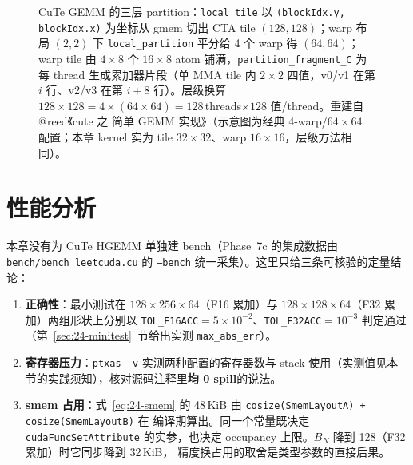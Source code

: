 \begin{figure}[htbp]
\caption{CuTe GEMM 的三层 partition：\texttt{local\_tile} 以 \texttt{\allowbreak{}(block\allowbreak{}Idx.\allowbreak{}y,\allowbreak{} block\allowbreak{}Idx.\allowbreak{}x)} 为坐标从 gmem 切出 CTA tile $(128,128)$；warp 布局 $(2,2)$ 下 \texttt{local\_\allowbreak{}partition} 平分给 4 个 warp 得 $(64,64)$；warp tile 由 $4\times8$ 个 $16\times8$ atom 铺满，\texttt{partition\_\allowbreak{}fragment\_\allowbreak{}C} 为每 thread 生成累加器片段（单 MMA tile 内 $2\times2$ 四值，v0/v1 在第 $i$ 行、v2/v3 在第 $i+8$ 行）。层级换算 $128\times128=4\times(64\times64)=128$\,threads$\times128$ 值/thread。重建自 @reed《cute 之 简单 GEMM 实现》（示意图为经典 4-warp/$64\times64$ 配置；本章 kernel 实为 tile $32\times32$、warp $16\times16$，层级方法相同）。}
\label{fig:24-3}
\end{figure}

\section{性能分析}

本章没有为 CuTe HGEMM 单独建 bench（Phase~7c 的集成数据由 \texttt{bench/bench\_leetcuda.cu}
的 \texttt{--bench} 统一采集）。这里只给三条可核验的定量结论：

\begin{enumerate}
  \item \textbf{正确性}：最小测试在 $128\times256\times64$（F16 累加）与
        $128\times128\times64$（F32 累加）两组形状上分别以
        \texttt{TOL\_F16ACC}$=5\times10^{-2}$、\texttt{TOL\_F32ACC}$=10^{-3}$
        判定通过（第~\ref{sec:24-minitest}~节给出实测 \texttt{max\_abs\_err}）。
  \item \textbf{寄存器压力}：\texttt{ptxas -v} 实测两种配置的寄存器数与 stack
        使用（实测值见本节的实践须知），核对源码注释里\textbf{均 0 spill}的说法。
  \item \textbf{smem 占用}：式~\eqref{eq:24-smem} 的 48\,KiB 由
        \texttt{cosize\allowbreak{}(Smem\allowbreak{}Layout\allowbreak{}A) + cosize\allowbreak{}(Smem\allowbreak{}Layout\allowbreak{}B)} 在
        编译期算出。同一个常量既决定 \texttt{cuda\allowbreak{}Func\allowbreak{}Set\allowbreak{}Attribute} 的实参，也决定
        occupancy 上限。$B_N$ 降到 128（F32 累加）时它同步降到 32\,KiB，
        精度换占用的取舍是类型参数的直接后果。
\end{enumerate}

